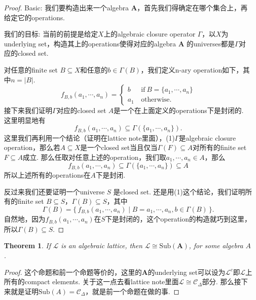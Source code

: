 \documentclass{article}
\newtheorem{theorem}{Theorem}[section]
\newcommand\Set[2]{\{\,#1\mid#2\,\}} %
\newcommand\lattice{\mathcal{L}}
\newcommand\algebra{\mathbf{A}}
\newcommand\Sub[1]{\text{Sub}(#1)}
\begin{document}
\begin{proof}
Basic: 我们要构造出来一个algebra $\algebra$，首先我们得确定在哪个集合上，再给定它的operations. 

我们的目标: 当前的前提是给定$X$上的algebraic closure operator $\Gamma$，以$X$为underlying set，构造其上的operations使得对应的algebra $\algebra$ 的universes都是$\Gamma$对应的closed set.

对任意的finite set $B \subseteq X$和任意的$b \in \Gamma(B)$，我们定义n-ary operation如下，其中$n = |B|$.
$$
f_{B,b}(a_1,\cdots,a_n) = \left\{
\begin{array}{ll} 
b \ & \text{if}\ B=\{a_1,\cdots,a_n\} \\ 
a_1\ & \text{otherwise}.  
\end{array}
\right.   
$$
接下来我们证明$\Gamma$对应的closed set $A$是一个在上面定义的operations下是封闭的. 这里明显地有
$$
f_{B,b}(a_1,\cdots,a_n) \subseteq \Gamma(\{a_1,\cdots,a_n\}).
$$
这里我们再利用一个结论（证明在lattice note里面），(1)$\Gamma$是algebraic closure operation，那么若$A \subseteq X$是一个closed set当且仅当$\Gamma(F) \subseteq A$对所有的finite set $F \subseteq A$成立. 那么任取对任意上述的operation，我们取$a_1,\cdots,a_n \in A$，那么
$$
f_{B,b}(a_1,\cdots,a_n) \subseteq \Gamma(\{a_1,\cdots,a_n\}) \subseteq A
$$
所以上述所有的operations在$A$下是封闭.

反过来我们还要证明一个universe $S$ 是closed set. 还是用(1)这个结论，我们证明所有的finite set $B \subseteq S$，$\Gamma(B) \subseteq S$，其中
$$
\Gamma(B) = \Set{f_{B,b}(a_1,\cdots,a_n)}{B={a_1,\cdots,a_n},b \in \Gamma(B)}.
$$
自然地，因为$f_{B,b}(a_1,\cdots,a_n)$在$S$下是封闭的，这个operation的构造就巧到这里，所以$\Gamma(B) \subseteq S$.
\end{proof}


\begin{theorem}
\rm If $\lattice$ is an algebraic lattice, then $\lattice \cong \Sub{\algebra}$, for some algebra $A$.
\end{theorem}

\begin{proof}
这个命题和前一个命题等价的，这里的$\algebra$的underlying set可以设为$\lattice^c$即$\lattice$上所有的compact elements. 关于这一点去看lattice note里面$\lattice \cong \mathcal{C}_{\Delta}$部分. 那么接下来就是证明$\Sub{A} =  \mathcal{C}_{\Delta}$，就是前一个命题在做的事.
\end{proof}
\end{document}
